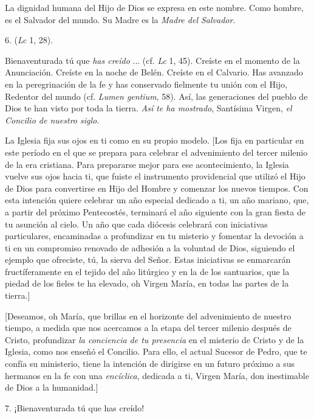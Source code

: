 \begin{body}
	La dignidad humana del Hijo de Dios se expresa en este nombre. Como hombre, es el Salvador del mundo. Su Madre es la \emph{Madre del 	Salvador}.
	
	6.  (\emph{Lc} 1, 28).
	
	Bienaventurada tú que \emph{has creído} ... (cf. \emph{Lc} 1, 45). Creíste en el momento de la Anunciación. Creíste en la noche de Belén. Creíste en el Calvario. Has avanzado en la peregrinación de la fe y has conservado fielmente tu unión con el Hijo, Redentor del mundo (cf. \emph{Lumen gentium}, 58). Así, las generaciones del pueblo de Dios te han visto por toda la tierra. \emph{Así te ha mostrado}, Santísima Virgen, \emph{el Concilio de nuestro siglo}.
	
	La Iglesia fija sus ojos en ti como en su propio modelo. {[}Los fija en particular en este período en el que se prepara para celebrar el advenimiento del tercer milenio de la era cristiana. Para prepararse mejor para ese acontecimiento, la Iglesia vuelve sus ojos hacia ti, que fuiste el instrumento providencial que utilizó el Hijo de Dios para convertirse en Hijo del Hombre y comenzar los nuevos tiempos. Con esta intención quiere celebrar un año especial dedicado a ti, un año mariano, que, a partir del próximo Pentecostés, terminará el año siguiente con la gran fiesta de tu asunción al cielo. Un año que cada diócesis celebrará con iniciativas particulares, encaminadas a profundizar en tu misterio y fomentar la devoción a ti en un compromiso renovado de adhesión a la voluntad de Dios, siguiendo el ejemplo que ofreciste, tú, la sierva del Señor. Estas iniciativas se enmarcarán fructíferamente en el tejido del año litúrgico y en la  de los santuarios, que la piedad de los fieles te ha elevado, oh Virgen María, en todas las partes de la tierra.{]}
	
	{[}Deseamos, oh María, que brillas en el horizonte del advenimiento de nuestro tiempo, a medida que nos acercamos a la etapa del tercer milenio después de Cristo, profundizar \emph{la conciencia de tu presencia} en el misterio de Cristo y de la Iglesia, como nos enseñó el Concilio. Para ello, el actual Sucesor de Pedro, que te confía su ministerio, tiene la intención de dirigirse en un futuro próximo a sus hermanos en la fe con una \emph{encíclica}, dedicada a ti, Virgen María, don inestimable de Dios a la humanidad.{]}
	
	7. ¡Bienaventurada tú que has creído!
	

\end{body}
